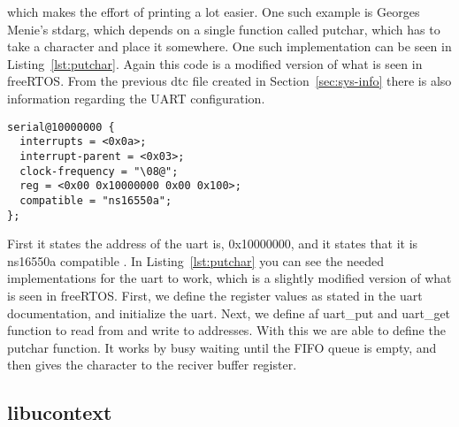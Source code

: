 which makes the effort of printing a lot easier. One such example is Georges Menie's stdarg,
which depends on a single function called putchar, which has to take a character and place it
somewhere. One such implementation can be seen in Listing~\ref{lst:putchar}. Again this code is
a modified version of what is seen in freeRTOS. From the previous dtc file created
in Section~\ref{sec:sys-info} there is also information regarding the UART configuration.
\begin{lstlisting}
serial@10000000 {
  interrupts = <0x0a>;
  interrupt-parent = <0x03>;
  clock-frequency = "\08@";
  reg = <0x00 0x10000000 0x00 0x100>;
  compatible = "ns16550a";
};
\end{lstlisting}
First it states the address of the uart is, 0x10000000, and it states that it is ns16550a compatible \cite{uart}. In Listing~\ref{lst:putchar} you can see the needed implementations for the
uart to work, which is a slightly modified version of what is seen in freeRTOS. First,
we define the register values as stated in the uart documentation, and initialize the uart.
Next, we define af uart\_put and uart\_get function to read from and write to addresses. With this we are able to define the putchar function. It works by busy waiting until the FIFO queue is
empty, and then gives the character to the reciver buffer register.

\subsection{libucontext}
